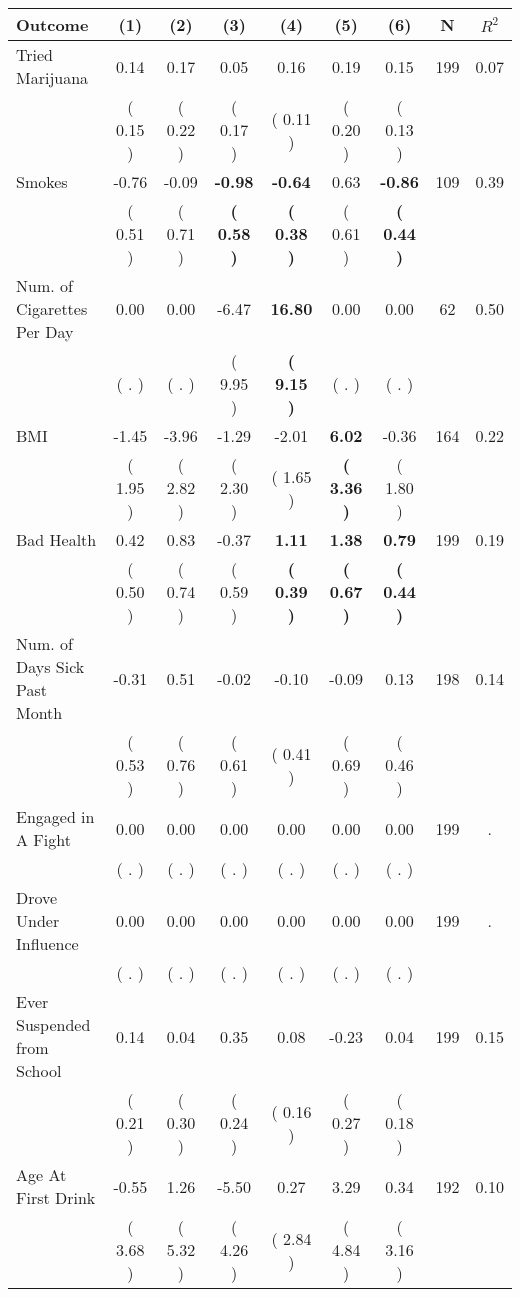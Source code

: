 \begin{tabular}{lcccccccc}
\toprule
 \textbf{Outcome} & \textbf{(1)} & \textbf{(2)} & \textbf{(3)} & \textbf{(4)} & \textbf{(5)} & \textbf{(6)} & \textbf{N} & \textbf{$ R^2$} \\
\midrule
Tried Marijuana &      0.14 &      0.17 &      0.05 &      0.16 &      0.19 &      0.15 & 199 &       0.07 \\ 
 & (     0.15 ) & (     0.22 ) & (     0.17 ) & (     0.11 ) & (     0.20 ) & (     0.13 ) & \\
Smokes &     -0.76 &     -0.09 & \textbf{    -0.98} & \textbf{    -0.64} &      0.63 & \textbf{    -0.86} & 109 &       0.39 \\ 
 & (     0.51 ) & (     0.71 ) & \textbf{(     0.58 )} & \textbf{(     0.38 )} & (     0.61 ) & \textbf{(     0.44 )} & \\
Num. of Cigarettes Per Day &      0.00 &      0.00 &     -6.47 & \textbf{    16.80} &      0.00 &      0.00 & 62 &       0.50 \\ 
 & (        . ) & (        . ) & (     9.95 ) & \textbf{(     9.15 )} & (        . ) & (        . ) & \\
BMI &     -1.45 &     -3.96 &     -1.29 &     -2.01 & \textbf{     6.02} &     -0.36 & 164 &       0.22 \\ 
 & (     1.95 ) & (     2.82 ) & (     2.30 ) & (     1.65 ) & \textbf{(     3.36 )} & (     1.80 ) & \\
Bad Health &      0.42 &      0.83 &     -0.37 & \textbf{     1.11} & \textbf{     1.38} & \textbf{     0.79} & 199 &       0.19 \\ 
 & (     0.50 ) & (     0.74 ) & (     0.59 ) & \textbf{(     0.39 )} & \textbf{(     0.67 )} & \textbf{(     0.44 )} & \\
Num. of Days Sick Past Month &     -0.31 &      0.51 &     -0.02 &     -0.10 &     -0.09 &      0.13 & 198 &       0.14 \\ 
 & (     0.53 ) & (     0.76 ) & (     0.61 ) & (     0.41 ) & (     0.69 ) & (     0.46 ) & \\
Engaged in A Fight &      0.00 &      0.00 &      0.00 &      0.00 &      0.00 &      0.00 & 199 &          . \\ 
 & (        . ) & (        . ) & (        . ) & (        . ) & (        . ) & (        . ) & \\
Drove Under Influence &      0.00 &      0.00 &      0.00 &      0.00 &      0.00 &      0.00 & 199 &          . \\ 
 & (        . ) & (        . ) & (        . ) & (        . ) & (        . ) & (        . ) & \\
Ever Suspended from School &      0.14 &      0.04 &      0.35 &      0.08 &     -0.23 &      0.04 & 199 &       0.15 \\ 
 & (     0.21 ) & (     0.30 ) & (     0.24 ) & (     0.16 ) & (     0.27 ) & (     0.18 ) & \\
Age At First Drink &     -0.55 &      1.26 &     -5.50 &      0.27 &      3.29 &      0.34 & 192 &       0.10 \\ 
 & (     3.68 ) & (     5.32 ) & (     4.26 ) & (     2.84 ) & (     4.84 ) & (     3.16 ) & \\
\bottomrule
\end{tabular}
